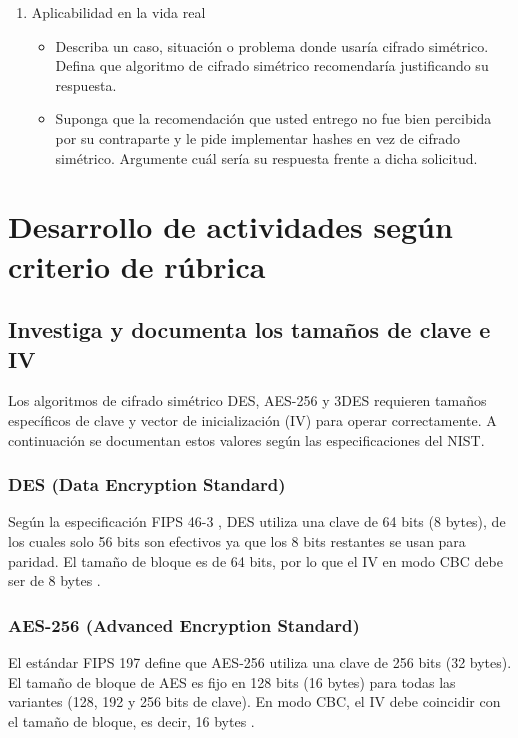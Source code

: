 \documentclass[letter,12pt]{article}
\begin{document}
\begin{enumerate}
    \item Aplicabilidad en la vida real
    \begin{itemize}
        \item Describa un caso, situación o problema donde usaría cifrado simétrico. Defina que algoritmo de cifrado simétrico recomendaría justificando su respuesta.
        \item Suponga que la recomendación que usted entrego no fue bien percibida por su contraparte y le pide implementar hashes en vez de cifrado simétrico. Argumente cuál sería su respuesta frente a dicha solicitud. 
    \end{itemize}
\end{enumerate}



\section{Desarrollo de actividades según criterio de rúbrica}

\subsection{Investiga y documenta los tamaños de clave e IV}

Los algoritmos de cifrado simétrico DES, AES-256 y 3DES requieren tamaños específicos de clave y vector de inicialización (IV) para operar correctamente. A continuación se documentan estos valores según las especificaciones del NIST.

\subsubsection*{DES (Data Encryption Standard)}
Según la especificación FIPS 46-3 \cite{nist_fips46}, DES utiliza una clave de 64 bits (8 bytes), de los cuales solo 56 bits son efectivos ya que los 8 bits restantes se usan para paridad. El tamaño de bloque es de 64 bits, por lo que el IV en modo CBC debe ser de 8 bytes \cite{dworkin2001}.

\subsubsection*{AES-256 (Advanced Encryption Standard)}
El estándar FIPS 197 \cite{nist_fips197} define que AES-256 utiliza una clave de 256 bits (32 bytes). El tamaño de bloque de AES es fijo en 128 bits (16 bytes) para todas las variantes (128, 192 y 256 bits de clave). En modo CBC, el IV debe coincidir con el tamaño de bloque, es decir, 16 bytes \cite{dworkin2001}.
\end{document}
